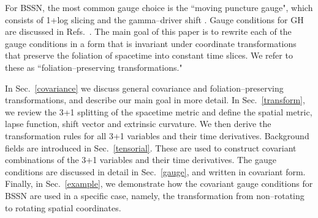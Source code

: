 \documentclass[letterpaper,nofootinbib,prd,amsmath,onecolumn]{revtex4-1}
\begin{document}
For BSSN, the most common gauge choice is the ``moving puncture gauge", which consists of 1+log slicing \cite{Bona:1994dr} and the
gamma--driver shift \cite{Alcubierre:2002kk}. Gauge conditions for GH are discussed in Refs.~\cite{Pretorius:2006tp,Szilagyi:2009qz}.  
The main goal of this paper is to rewrite each of the gauge conditions in a form that is invariant under coordinate transformations that 
preserve the foliation of spacetime into constant time slices. We refer to these as ``foliation--preserving transformations."

In Sec.~\ref{covariance} we discuss general covariance and foliation--preserving transformations, and describe our main goal in more detail. 
In Sec.~\ref{transform}, we review the 3+1 splitting of the spacetime metric and define the spatial metric, lapse function, shift vector and extrinsic curvature. 
We then derive the transformation rules for all 3+1 variables and their time derivatives. 
Background fields are introduced in Sec.~\ref{tensorial}. These are used to construct covariant combinations of the 3+1 variables and their time derivatives. 
The gauge conditions are discussed in detail in Sec.~\ref{gauge}, and written in covariant form. 
Finally, in Sec.~\ref{example}, we demonstrate how the covariant gauge conditions for BSSN are used in a specific case, namely, the transformation 
from non--rotating to rotating spatial coordinates. 

\end{document}
